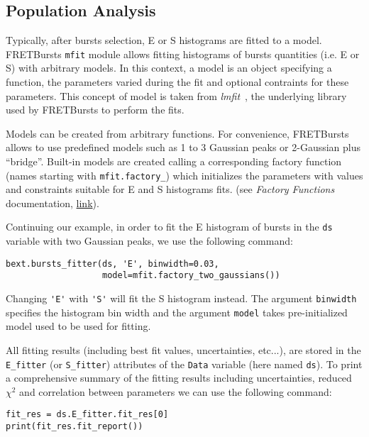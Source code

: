 \subsection{Population Analysis}
\label{sec:fretfit}

Typically, after bursts selection, E or S histograms are fitted to a model.
FRETBursts \verb|mfit| module allows fitting histograms of bursts quantities
(i.e. E or S) with arbitrary models. In this context, a model is an object 
specifying a function, the parameters varied during the fit
and optional contraints for these parameters. This concept of model
is taken from \textit{lmfit}~\cite{lmfit}, the underlying library used by
FRETBursts to perform the fits.

Models can be created from arbitrary functions. For convenience,
FRETBursts allows to use predefined models such as 1 to 3 Gaussian
peaks or 2-Gaussian plus ``bridge''.
Built-in models are created calling a corresponding factory function
(names starting with \verb|mfit.factory_|) which initializes the parameters
with values and constraints suitable for E and S histograms fits.
(see \textit{Factory Functions} documentation, 
\href{http://fretbursts.readthedocs.org/en/latest/mfit.html#model-factory-functions}{link}).

Continuing our example, in order to fit the E histogram of bursts in the
\verb|ds| variable with two Gaussian peaks, we use the following command:

\begin{lstlisting}
bext.bursts_fitter(ds, 'E', binwidth=0.03,
                   model=mfit.factory_two_gaussians())
\end{lstlisting}

Changing \verb|'E'| with \verb|'S'| will fit the S histogram instead.
The argument \verb|binwidth| specifies the histogram bin width and 
the argument \verb|model| takes pre-initialized model used to be used for
fitting. 

All fitting results (including best fit values, uncertainties, etc...), 
are stored in the \verb|E_fitter| (or \verb|S_fitter|)
attributes of the \verb|Data| variable (here named \verb|ds|).
To print a comprehensive summary of the fitting results including
uncertainties, reduced $\chi^2$ and correlation between parameters
we can use the following command:

\begin{lstlisting}
fit_res = ds.E_fitter.fit_res[0]
print(fit_res.fit_report())
\end{lstlisting}

